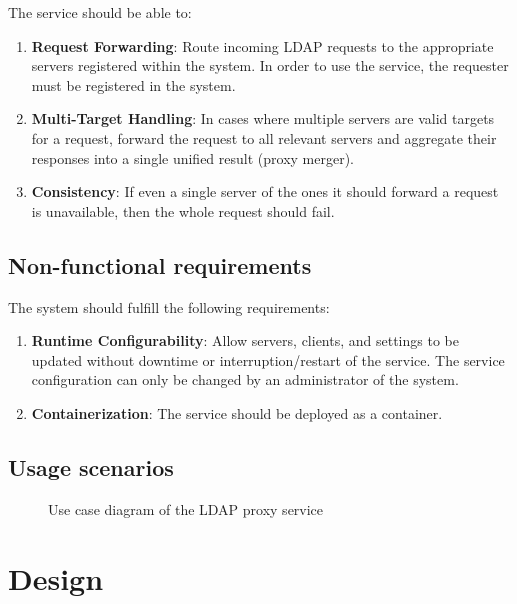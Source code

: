 \documentclass{scrartcl}
\begin{document}
\par The service should be able to:

\begin{enumerate}
    \item \textbf{Request Forwarding}: Route incoming LDAP requests to the appropriate servers registered within the system. In order to use the service, the requester must be registered in the system.
    \item \textbf{Multi-Target Handling}: In cases where multiple servers are valid targets for a request, forward the request to all relevant servers and aggregate their responses into a single unified result (proxy merger).
    \item \textbf{Consistency}: If even a single server of the ones it should forward a request is unavailable, then the whole request should fail.
\end{enumerate}

\subsection{Non-functional requirements}

\par The system should fulfill the following requirements:

\begin{enumerate}
    \item \textbf{Runtime Configurability}: Allow servers, clients, and settings to be updated without downtime or interruption/restart of the service. The service configuration can only be changed by an administrator of the system.
    \item \textbf{Containerization}: The service should be deployed as a container.
\end{enumerate}

\subsection{Usage scenarios}

\begin{figure}[h]
    \centering
    
    \caption{Use case diagram of the LDAP proxy service}
    \label{fig:usecase} 
\end{figure}


\section{Design}
\label{sec:design}
\end{document}
